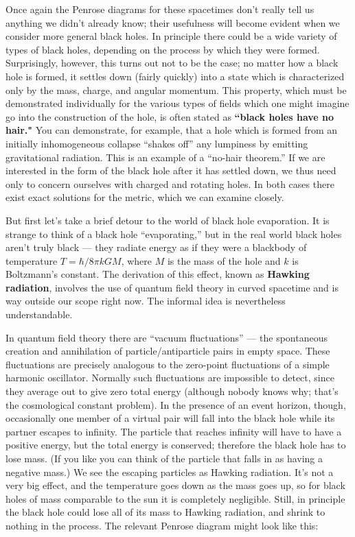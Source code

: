 Once again the Penrose diagrams for these spacetimes don't
really tell us anything we didn't already know; their usefulness
will become evident when we consider more
general black holes.  In principle there
could be a wide variety of types of black holes, depending on
the process by which they were formed.  Surprisingly, however,
this turns out not to be the case; no matter how a black
hole is formed, it settles down (fairly quickly) into a
state which is characterized only by the mass, charge, and
angular momentum.  This property, which must be demonstrated
individually for the various types of fields which one might
imagine go into the construction of the hole, is often
stated as {\bf ``black holes have no hair."}  You can 
demonstrate, for example, that a hole which is formed from
an initially inhomogeneous collapse ``shakes off'' any
lumpiness by emitting gravitational radiation.  This is an
example of a ``no-hair theorem.''  If we are interested in
the form of the black hole after it has settled down, we thus
need only to concern ourselves with charged and rotating
holes.  In both cases there exist exact
solutions for the metric, which we can examine closely.

But first let's take a brief detour to the world of black
hole evaporation.
It is strange to think of a black hole ``evaporating,'' but in
the real world black holes aren't truly black --- they radiate
energy as if they were a blackbody of temperature $T=\hbar/8\pi
kGM$, where $M$ is the mass of the hole and $k$ is Boltzmann's
constant.  The derivation of this effect, known as {\bf Hawking
radiation}, involves the use of quantum field theory in curved
spacetime and is way outside our scope right now.  The informal
idea is nevertheless understandable.  
\begin{figure}[b]
  \centerline{
  }
\end{figure}
In quantum field theory
there are ``vacuum fluctuations'' --- the spontaneous creation and
annihilation of particle/antiparticle pairs in empty space.  
These fluctuations are precisely analogous to the zero-point
fluctuations of a simple harmonic oscillator.  Normally such
fluctuations are impossible to detect, since they average out
to give zero total energy (although nobody knows why; that's
the cosmological constant problem).  In the presence of an event
horizon, though, occasionally one member of a virtual pair will
fall into the black hole while its partner escapes to infinity.
The particle that reaches infinity will have to have a positive
energy, but the total energy is conserved; therefore the black
hole has to lose mass.  (If you like you can think of the particle
that falls in as having a negative mass.)  
We see the escaping particles as Hawking radiation.
It's not a very big effect, and the temperature goes down as the
mass goes up, so for black holes of mass comparable to the sun it
is completely negligible.  Still, in principle the black hole could
lose all of its mass to Hawking radiation, and shrink to nothing in
the process.  The relevant Penrose diagram might look like this:

